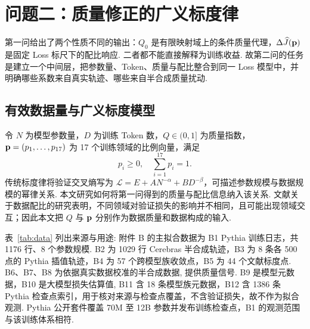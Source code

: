 \section{问题二：质量修正的广义标度律}\label{sec:q2}

第一问给出了两个性质不同的输出：$Q_0$ 是有限映射域上的条件质量代理，$\Delta\widehat J(\mathbf p)$ 是固定 Loss 标尺下的配比响应. 二者都不能直接解释为训练收益. 故第二问的任务是建立一个中间层，把参数量、Token、质量与配比整合到同一 Loss 模型中，并明确哪些系数来自真实轨迹、哪些来自半合成质量扰动. 

\subsection{有效数据量与广义标度模型}

令 $N$ 为模型参数量，$D$ 为训练 Token 数，\(Q\in(0,1]\) 为质量指数，\(\mathbf p=(p_1,\ldots,p_{17})\) 为 17 个训练领域的比例向量，满足
\begin{equation}
p_i\ge 0,\quad \sum_{i=1}^{17}p_i=1.
\end{equation}
传统标度律将验证交叉熵写为 \(\mathcal L=E+AN^{-\alpha}+BD^{-\beta}\)，可描述参数规模与数据规模的幂律关系\cite{kaplan,hoffmann,bahri}. 本文研究如何将第一问得到的质量与配比信息纳入该关系. 文献关于数据配比的研究表明，不同领域对验证损失的影响并不相同，且可能出现领域交互\cite{regmix,doremi}；因此本文把 $Q$ 与 \(\mathbf p\) 分别作为数据质量和数据构成的输入. 

表~\ref{tab:data} 列出来源与用途: 附件 B 的主拟合数据为 B1 Pythia 训练日志，共 1176 行、8 个参数规模. B2 为 1029 行 Cerebras 半合成轨迹，B3 为 8 条各 500 点的 Pythia 插值轨迹，B4 为 57 个跨模型族收敛点，B5 为 44 个文献标度点. B6、B7、B8 为依据真实数据校准的半合成数据, 提供质量信号. B9 是模型元数据，B10 是大模型损失估算值, B11 含 18 条模型族元数据，B12 含 1386 条 Pythia 检查点索引，用于核对来源与检查点覆盖，不含验证损失，故不作为拟合观测. Pythia 公开套件覆盖 70M 至 12B 参数并发布训练检查点，B1 的观测范围与该训练体系相符. %


